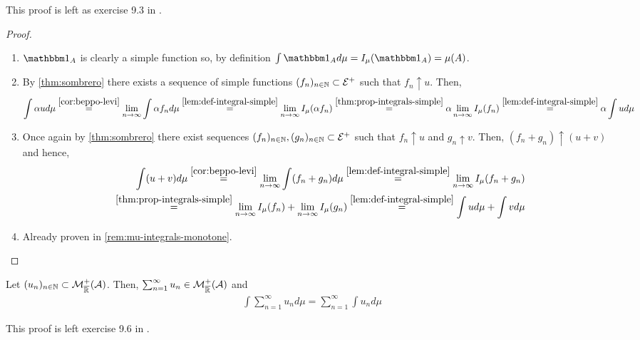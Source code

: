 This proof is left as exercise 9.3 in \cite[p. 79]{schilling2017}.

\begin{proof}$ $\newline
	\begin{enumerate}
		\item $\ind_A$ is clearly a simple function so, by definition $\int \ind_A d\mu = I_\mu(\ind_A) = \mu(A)$.
		\item By \autoref{thm:sombrero} there exists a sequence of simple functions $(f_n)_{n\in\mathbb{N}} \subset \mathcal{E}^+$ such that $f_n \uparrow u$. Then,
		\begin{align*}
			\int \alpha u d\mu
			\overset{\ref{cor:beppo-levi}}{=} \lim_{n \to \infty} \int \alpha f_n d\mu
		    \overset{\ref{lem:def-integral-simple}}{=} \lim_{n \to \infty} I_\mu(\alpha f_n)
		    \overset{\ref{thm:prop-integrals-simple}}{=} \alpha \lim_{n \to \infty} I_\mu(f_n)
		    \overset{\ref{lem:def-integral-simple}}{=} \alpha \int u d \mu
		\end{align*}
		\item Once again by \autoref{thm:sombrero} there exist sequences $(f_n)_{n\in\mathbb{N}}, (g_n)_{n\in \mathbb{N}} \subset \mathcal{E}^+$ such that $f_n \uparrow u$ and $g_n \uparrow v$. Then, $(f_n + g_n) \uparrow (u + v)$ and hence,
		\begin{align*}
			\int (u + v)d\mu
			\overset{\ref{cor:beppo-levi}}{=} \lim_{n \to \infty}  \int (f_n  + g_n)d\mu
			\overset{\ref{lem:def-integral-simple}}{=} \lim_{n \to \infty} I_\mu(f_n + g_n)\\
			\overset{\ref{thm:prop-integrals-simple}}{=} \lim_{n \to \infty} I_\mu(f_n) + \lim_{n \to \infty} I_\mu(g_n)
			\overset{\ref{lem:def-integral-simple}}{=} \int u d\mu + \int v d\mu
		\end{align*}
		\item Already proven in \autoref{rem:mu-integrals-monotone}.
	\end{enumerate}
\end{proof}

\begin{cor}
	\label{cor:integral-countable-sum}
	Let $(u_n)_{n\in\mathbb{N}} \subset \mathcal{M}^+_{\overline{\mathbb{R}}}(\mathcal{A})$. Then, $\sum_{n = 1}^{\infty} u_n \in \mathcal{M}_{\overline{\mathbb{R}}}^+(\mathcal{A})$ and
	\begin{align}
		\int \sum_{n = 1}^\infty u_n d\mu = \sum_{n = 1}^\infty \int u_n d\mu
	\end{align}
\end{cor}

This proof is left exercise 9.6 in \cite[p. 79]{schilling2017}.

